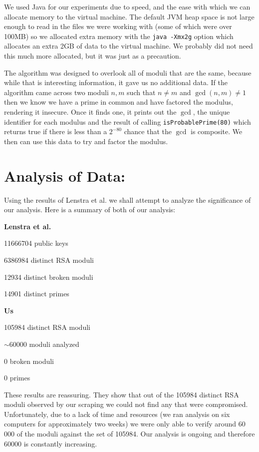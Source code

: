 \documentclass[11pt,twoside]{article}
\newcommand{\ty}[1]{\texttt{#1}}
\begin{document}
\begin{multicols}{2}
We used Java for our experiments due to speed, and the ease with which we can
allocate memory to the virtual machine. The default JVM heap space is not large
enough to read in the files we were working with (some of which were over 100MB)
so we allocated extra memory with the \ty{java -Xmx2g} option which allocates an
extra 2GB of data to the virtual machine. We probably did not need this much
more allocated, but it was just as a precaution.

The algorithm was designed to overlook all of moduli that are the same, because
while that is interesting information, it gave us no additional data. If the
algorithm came across two moduli $n,m$ such that $n \neq m$ and $\gcd(n,m) \neq
1$ then we know we have a prime in common and have factored the modulus,
rendering it insecure. Once it finds one, it prints out the $\gcd$, the unique
identifier for each modulus and the result of calling \ty{isProbablePrime(80)}
which returns true if there is less than a $2^{-80}$ chance that the $\gcd$ is
composite. We then can use this data to try and factor the modulus.

\section{Analysis of Data:}
Using the results of Lenstra et al. we shall attempt to analyze the significance
of our analysis. Here is a summary of both of our analysis:

\textbf{Lenstra et al.}
\begin{compactitem}
\item 11666704 public keys
\item 6386984 distinct RSA moduli
\item 12934 distinct broken moduli
\item 14901 distinct primes
\end{compactitem}

\textbf{Us}
\begin{compactitem}
\item 105984 distinct RSA moduli
\item $\sim$60000 moduli analyzed
\item 0 broken moduli
\item 0 primes
\end{compactitem}

These results are reassuring. They show that out of the 105984 distinct RSA
moduli observed by our scraping we could not find any that were compromised.
Unfortunately, due to a lack of time and resources (we ran analysis on six
computers for approximately two weeks) we were only able to verify around 60 000
of the moduli against the set of 105984. Our analysis is ongoing and therefore
60000 is constantly increasing. 


\end{multicols}
\end{document}
